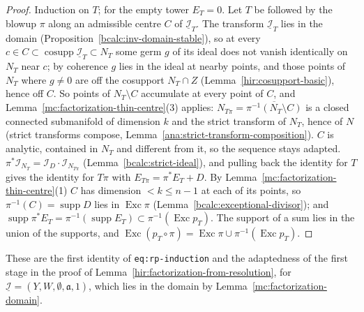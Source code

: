 \begin{proof}
\leanok
Induction on \(T\); for the empty tower \(E_T=0\). Let \(T\) be followed by the blowup \(\pi\) along an admissible centre \(C\) of \(\underline{\mathcal I}_T\). The transform
\(\underline{\mathcal I}_T\) lies in the domain (Proposition~\ref{bcalc:inv-domain-stable}), so at every \(c\in C\subset\operatorname{cosupp}\underline{\mathcal I}_T\subset N_T\) some
germ \(g\) of its ideal does not vanish identically on \(N_T\) near \(c\); by coherence \(g\) lies in the ideal at nearby points, and those points of \(N_T\) where \(g\neq0\)
are off the cosupport \(N_T\cap Z\) (Lemma~\ref{hir:cosupport-basic}), hence off \(C\). So points of \(N_T\setminus C\) accumulate at every point of \(C\), and
Lemma~\ref{mc:factorization-thin-centre}(3) applies: \(N_{T\pi}=\overline{\pi^{-1}(N_T\setminus C)}\) is a closed connected submanifold of dimension \(k\) and the strict transform of
\(N_T\), hence of \(N\) (strict transforms compose, Lemma~\ref{ana:strict-transform-composition}). \(C\) is analytic, contained in \(N_T\) and different from it, so the
sequence stays adapted. \(\pi^*\mathcal I_{N_T}=\mathcal I_D\cdot\mathcal I_{N_{T\pi}}\) (Lemma~\ref{bcalc:strict-ideal}), and pulling back the identity for \(T\) gives the identity
for \(T\pi\) with \(E_{T\pi}=\pi^*E_T+D\). By Lemma~\ref{mc:factorization-thin-centre}(1) \(C\) has dimension \(<k\le n-1\) at each of its points, so \(\pi^{-1}(C)=\operatorname{supp}D\)
lies in \(\operatorname{Exc}\pi\) (Lemma~\ref{bcalc:exceptional-divisor}); and \(\operatorname{supp}\pi^*E_T=\pi^{-1}(\operatorname{supp}E_T)\subset\pi^{-1}(\operatorname{Exc}p_T)\). The
support of a sum lies in the union of the supports, and \(\operatorname{Exc}(p_T\circ\pi)=\operatorname{Exc}\pi\cup\pi^{-1}(\operatorname{Exc}p_T)\).
\end{proof}
These are the first identity of \texttt{eq:rp-induction} and the adaptedness of the first stage in the proof of Lemma~\ref{hir:factorization-from-resolution}, for
\(\underline{\mathcal I}=(Y,W,\emptyset,\mathfrak a,1)\), which lies in the domain by Lemma~\ref{mc:factorization-domain}.

